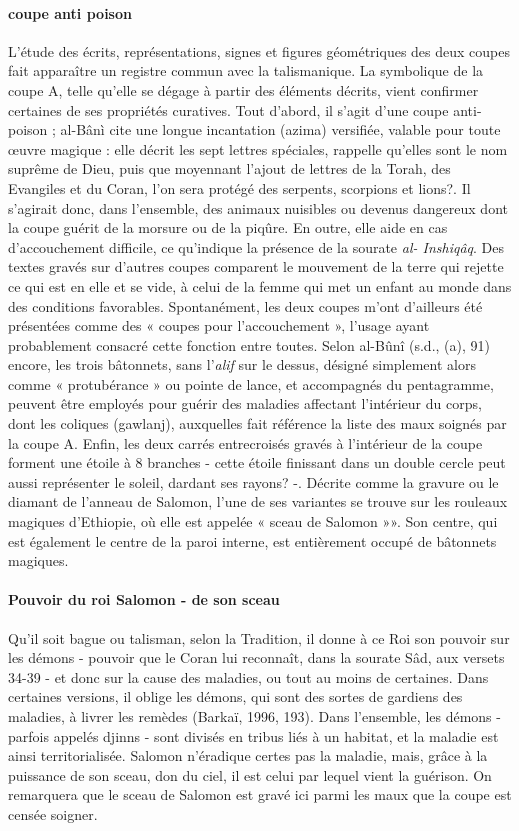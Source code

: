   \paragraph{coupe anti poison}
L'étude des écrits, représentations, signes et figures géométriques des deux coupes fait apparaître un registre commun avec la talismanique. La symbolique de la coupe A, telle qu'elle se dégage à partir des éléments décrits, vient confirmer certaines de ses propriétés curatives. Tout d'abord, il s'agit d'une coupe anti-poison ; al-Bânì cite une longue incantation (azima) versifiée, valable pour toute œuvre magique : elle décrit les sept lettres spéciales, rappelle qu'elles sont le nom suprême de Dieu, puis que moyennant l'ajout de lettres de la Torah, des Evangiles et du Coran, l'on sera protégé des serpents, scorpions et lions?. Il s'agirait donc, dans l'ensemble, des animaux nuisibles ou devenus dangereux dont la coupe guérit de la morsure ou de la piqûre. En outre, elle aide en cas d'accouchement difficile, ce qu'indique la présence de la sourate \textit{al-
Inshiqâq}. Des textes gravés sur d'autres coupes comparent le mouvement de la terre qui rejette ce qui est en elle et se vide, à celui de la femme qui met un enfant au monde dans des conditions favorables. Spontanément, les deux coupes m'ont d'ailleurs été présentées comme des « coupes pour l'accouchement », l'usage ayant probablement consacré cette fonction entre toutes. Selon al-Bûnî (s.d., (a), 91) encore, les trois bâtonnets, sans l'\textit{alif} sur le dessus, désigné simplement alors comme « protubérance » ou pointe de lance, et accompagnés du pentagramme, peuvent être employés pour guérir des maladies affectant l'intérieur du corps, dont les coliques (gawlanj), auxquelles fait référence la liste des maux soignés par la coupe
A. Enfin, les deux carrés entrecroisés gravés à l'intérieur de la coupe forment une étoile à 8 branches - cette étoile finissant dans un double cercle peut aussi représenter le soleil, dardant ses rayons? -. Décrite comme la gravure ou le diamant de l'anneau de Salomon, l'une de ses variantes se trouve sur les rouleaux magiques d'Ethiopie, où elle est appelée « sceau de Salomon »». Son centre, qui est également le centre de la paroi interne, est entièrement occupé de bâtonnets magiques. 
\paragraph{Pouvoir du roi Salomon - de son sceau}
Qu'il soit bague ou talisman, selon la Tradition, il donne à ce Roi son pouvoir sur les démons
-  pouvoir que le Coran lui reconnaît, dans la sourate Sâd, aux versets 34-39 - et donc sur la cause des maladies, ou tout au moins de certaines.
Dans certaines versions, il oblige les démons, qui sont des sortes de gardiens des maladies, à livrer les remèdes (Barkaï, 1996, 193). Dans l'ensemble, les démons - parfois appelés djinns - sont divisés en tribus liés à un habitat, et la maladie est ainsi territorialisée. Salomon n'éradique certes pas la maladie, mais, grâce à la puissance de son sceau, don du ciel, il est celui par lequel vient la guérison. On remarquera que le sceau de Salomon est gravé ici parmi les maux que la coupe est censée soigner.

